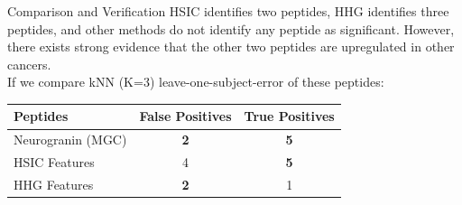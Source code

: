 \documentclass[mathserif,t]{beamer}
\newcommand{\Mgc}{MGC}
\begin{document}

\begin{frame}{Comparison and Verification}
\pause
HSIC identifies two peptides, HHG identifies three peptides, and other methods do not identify any peptide as significant. However, there exists strong evidence that the other two peptides are upregulated in other cancers.\\

\pause
\medskip
If we compare kNN (K=3) leave-one-subject-error of these peptides: 
\medskip
\begin{tabular}{|l||c|c|}
\hline
Peptides & False Positives & True Positives   \\
\hline
 \textcolor{UniOrange}{Neurogranin (MGC)}  & \textbf{2}  & \textbf{5} \\
\hline
HSIC Features & 4  & \textbf{5}  \\
\hline
HHG Features & \textbf{2}  & 1  \\
\hline
\end{tabular}\\
\pause
\medskip
\end{frame}
\end{document}

